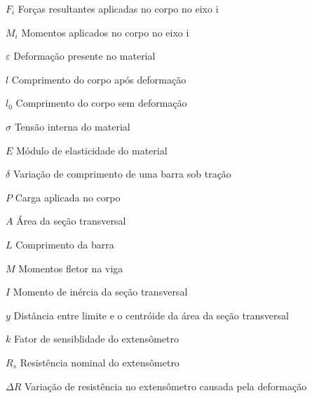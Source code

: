 

\begin{simbolos}

    \item[$ F_{i} $] {Forças resultantes aplicadas no corpo no eixo i}
    \item[$ M_{i} $] {Momentos aplicados no corpo no eixo i}

    \item[$ \varepsilon $] {Deformação presente no material}
    \item[$ l $] {Comprimento do corpo após deformação}
    \item[$ l_0 $] {Comprimento do corpo sem deformação}

    \item[$ \sigma $] {Tensão interna do material}
    \item[$ E $] {Módulo de elasticidade do material}

    \item[$ \delta $] {Variação de comprimento de uma barra sob tração}
    \item[$ P $] {Carga aplicada no corpo}
    \item[$ A $] {Área da seção transversal}
    \item[$ L $] {Comprimento da barra}

%
%

    \item[$ M $] {Momentos fletor na viga}
    \item[$ I $] {Momento de inércia da seção transversal}
    \item[$ y $] {Distância entre limite e o centróide da área da seção transversal}

    \item[$ k $] {Fator de sensiblidade do extensômetro}
    \item[$ R_s $] {Resistência nominal do extensômetro}
    \item[$ \Delta R $] {Variação de resistência no extensômetro causada pela deformação}


\end{simbolos}
